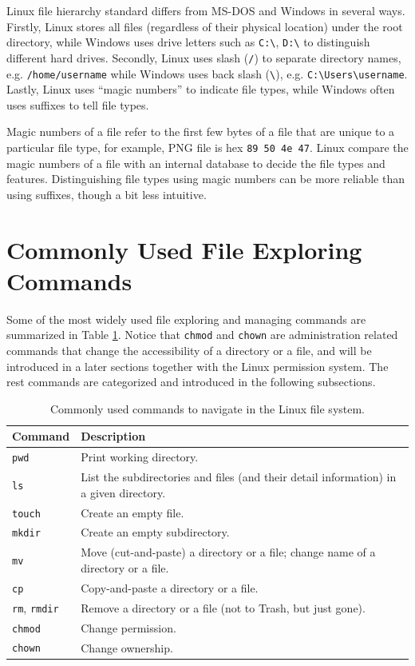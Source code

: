 Linux file hierarchy standard differs from MS-DOS and Windows in several ways. Firstly, Linux stores all files (regardless of their physical location) under the root directory, while Windows uses drive letters such as \verb|C:\|, \verb|D:\| to distinguish different hard drives. Secondly, Linux uses slash (\verb|/|) to separate directory names, e.g. \verb|/home/username| while Windows uses back slash (\verb|\|), e.g. \verb|C:\Users\username|. Lastly, Linux uses ``magic numbers'' to indicate file types, while Windows often uses suffixes to tell file types. 

Magic numbers of a file refer to the first few bytes of a file that are unique to a particular file type, for example, PNG file is hex \verb|89 50 4e 47|. Linux compare the magic numbers of a file with an internal database to decide the file types and features. Distinguishing file types using magic numbers can be more reliable than using suffixes, though a bit less intuitive.

\section{Commonly Used File Exploring Commands} \label{ch:fm:sec:filemanagement}

Some of the most widely used file exploring and managing commands are summarized in Table \ref{ch:fm:tab:commonfilecommands}. Notice that \verb|chmod| and \verb|chown| are administration related commands that change the accessibility of a directory or a file, and will be introduced in a later sections together with the Linux permission system. The rest commands are categorized and introduced in the following subsections.

\begin{table}
  \centering \caption{Commonly used commands to navigate in the Linux file system.}\label{ch:fm:tab:commonfilecommands}
  \begin{tabularx}{\textwidth}{lX}
    \hline
    Command & Description \\ \hline
    \verb|pwd| & Print working directory. \\ 
    \verb|ls| & List the subdirectories and files (and their detail information) in a given directory. \\ 
    \verb|touch| & Create an empty file. \\ 
    \verb|mkdir| & Create an empty subdirectory. \\ 
    \verb|mv| & Move (cut-and-paste) a directory or a file; change name of a directory or a file. \\ 
    \verb|cp| & Copy-and-paste a directory or a file. \\ 
    \verb|rm|, \verb|rmdir| & Remove a directory or a file (not to Trash, but just gone). \\ 
    \verb|chmod| & Change permission. \\ 
    \verb|chown| & Change ownership. \\
    \hline
  \end{tabularx}
\end{table}

